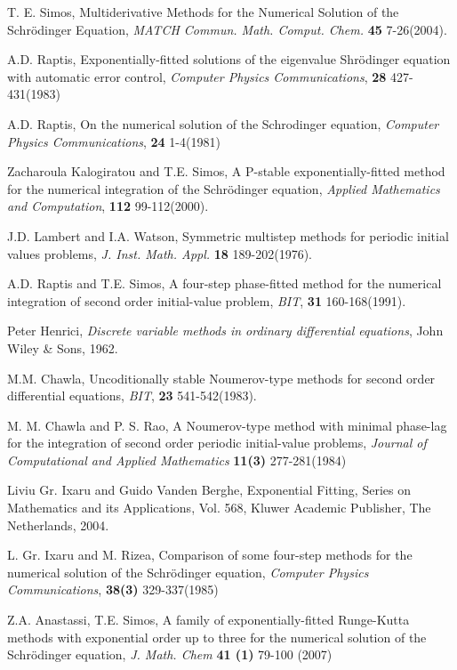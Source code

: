 \documentclass[numreferences]{kluwer}
\begin{document}
\begin{article}
\begin{thebibliography}{120}
 T. E. Simos, Multiderivative
Methods for the Numerical Solution of the Schr\"odinger Equation,
{\it MATCH Commun. Math. Comput. Chem.} {\bf 45} 7-26(2004).

 A.D. Raptis, Exponentially-fitted solutions of the
eigenvalue Shr\"odinger equation with automatic error control,
{\it Computer Physics Communications}, {\bf 28} 427-431(1983)

 A.D. Raptis, On the numerical solution of the Schrodinger
equation, {\it Computer Physics Communications}, {\bf 24}
1-4(1981)

 Zacharoula Kalogiratou and T.E. Simos, A P-stable exponentially-fitted method for the numerical
integration of the Schr\"odinger equation, {\it Applied
Mathematics and Computation}, {\bf 112} 99-112(2000).

 J.D. Lambert and I.A.
Watson, Symmetric multistep methods for periodic initial values
problems, {\it J. Inst. Math. Appl.} {\bf 18} 189-202(1976).

 A.D. Raptis and T.E. Simos, A four-step phase-fitted method for the numerical  integration
of  second  order  initial-value  problem, {\it BIT}, {\bf 31}
160-168(1991).

 Peter Henrici, {\it Discrete variable methods in ordinary differential equations}, John Wiley
\& Sons, 1962.

 M.M. Chawla, Uncoditionally stable Noumerov-type methods for second order differential equations, {\it BIT},
{\bf 23} 541-542(1983).

 M. M. Chawla and P. S. Rao, A Noumerov-type method with minimal phase-lag for the integration of second order periodic initial-value problems, {\it Journal of Computational and Applied Mathematics}  {\bf 11(3)}
277-281(1984)

 Liviu Gr. Ixaru and Guido Vanden Berghe,
Exponential Fitting, Series on Mathematics and its Applications,
Vol. 568, Kluwer Academic Publisher, The Netherlands, 2004.

 L. Gr. Ixaru and M. Rizea, Comparison of some four-step methods for the numerical solution of the Schr\"odinger equation, {\it Computer
Physics Communications}, {\bf 38(3)} 329-337(1985)

Z.A. Anastassi, T.E. Simos, A family of exponentially-fitted Runge-Kutta methods with exponential order up to three for the numerical solution of the Schr\"odinger equation, {\it J. Math. Chem} {\bf 41 (1)} 79-100 (2007)


\end{thebibliography}
\end{article}
\end{document}
